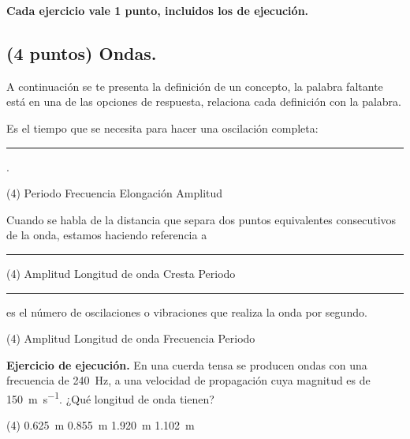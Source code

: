 \documentclass[12pt, letter]{exam}
\begin{document}

\setcounter{page}{3}

\newpage
\begin{center}
\textbf{Cada ejercicio vale 1 punto, incluidos los de ejecución.}
\end{center}

\begin{questions}

    \section{(4 puntos) Ondas.}
    
    \vbox{\leftskip\leftmargin A continuación se te presenta la definición de un concepto, la palabra faltante está en una de las opciones de respuesta, relaciona cada definición con la palabra.}

    \question Es el tiempo que se necesita para hacer una oscilación completa: \rule{2cm}{0.1mm}. 
    \begin{tasks}(4)
        \task Periodo
        \task Frecuencia
        \task Elongación
        \task Amplitud
    \end{tasks}
    \question Cuando se habla de la distancia que separa dos puntos equivalentes consecutivos de la onda, estamos haciendo referencia a \rule{2cm}{0.1mm} 
    \begin{tasks}(4)
        \task Amplitud
        \task Longitud de onda
        \task Cresta
        \task Periodo
    \end{tasks}
    \question \rule{2cm}{0.1mm} es el número de oscilaciones o vibraciones que realiza la onda por segundo.
    \begin{tasks}(4)
        \task Amplitud
        \task Longitud de onda
        \task Frecuencia
        \task Periodo
    \end{tasks}
    \question \label{Ejercicio_01} \textbf{Ejercicio de ejecución.} En una cuerda tensa se producen ondas con una frecuencia de \SI{240}{\hertz}, a una velocidad de propagación cuya magnitud es de \SI{150}{\meter\per\second}. ¿Qué longitud de onda tienen?
    \begin{tasks}(4)
       \task \SI{0.625}{\meter}
       \task \SI{0.855}{\meter}
       \task \SI{1.920}{\meter}
       \task \SI{1.102}{\meter}
   \end{tasks}


\end{questions}
\end{document}
